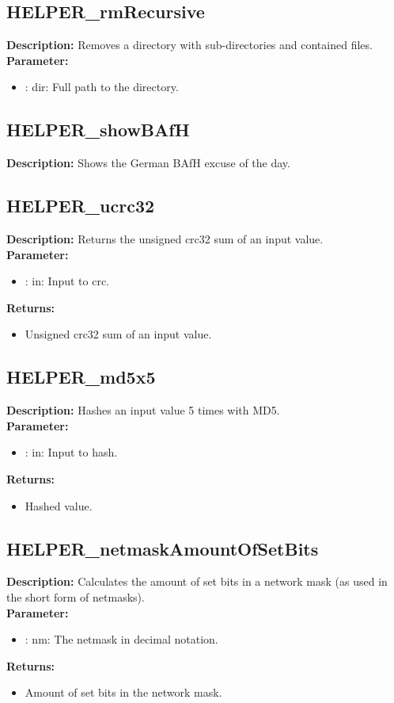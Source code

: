 \subsection{HELPER\_rmRecursive}
\textbf{Description:} Removes a directory with sub-directories and contained files.\\
\textbf{Parameter:}
\begin{itemize}
\item : dir: Full path to the directory.
\end{itemize}

\subsection{HELPER\_showBAfH}
\textbf{Description:} Shows the German BAfH excuse of the day.\\

\subsection{HELPER\_ucrc32}
\textbf{Description:} Returns the unsigned crc32 sum of an input value.\\
\textbf{Parameter:}
\begin{itemize}
\item : in: Input to crc.
\end{itemize}
\textbf{Returns:}
\begin{itemize}
\item Unsigned crc32 sum of an input value.
\end{itemize}

\subsection{HELPER\_md5x5}
\textbf{Description:} Hashes an input value 5 times with MD5.\\
\textbf{Parameter:}
\begin{itemize}
\item : in: Input to hash.
\end{itemize}
\textbf{Returns:}
\begin{itemize}
\item Hashed value.
\end{itemize}

\subsection{HELPER\_netmaskAmountOfSetBits}
\textbf{Description:} Calculates the amount of set bits in a network mask (as used in the short form of netmasks).\\
\textbf{Parameter:}
\begin{itemize}
\item : nm: The netmask in decimal notation.
\end{itemize}
\textbf{Returns:}
\begin{itemize}
\item Amount of set bits in the network mask.
\end{itemize}

